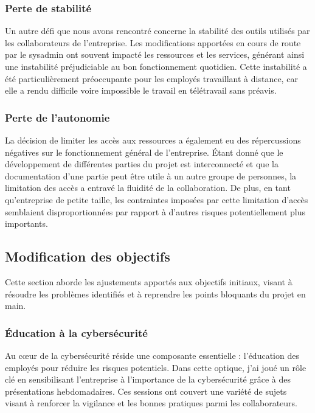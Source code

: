 \subsubsection{Perte de stabilité}
Un autre défi que nous avons rencontré concerne la stabilité des outils utilisés par les collaborateurs de l'entreprise.
Les modifications apportées en cours de route par le sysadmin ont souvent impacté les ressources et les services, générant ainsi une instabilité préjudiciable au bon fonctionnement quotidien.
Cette instabilité a été particulièrement préoccupante pour les employés travaillant à distance, car elle a rendu difficile voire impossible le travail en télétravail sans préavis.

\subsubsection{Perte de l'autonomie}
La décision de limiter les accès aux ressources a également eu des répercussions négatives sur le fonctionnement général de l'entreprise.
Étant donné que le développement de différentes parties du projet est interconnecté et que la documentation d'une partie peut être utile à un autre groupe de personnes, la limitation des accès a entravé la fluidité de la collaboration.
De plus, en tant qu'entreprise de petite taille, les contraintes imposées par cette limitation d'accès semblaient disproportionnées par rapport à d'autres risques potentiellement plus importants.

\newpage

\subsection{Modification des objectifs}
Cette section aborde les ajustements apportés aux objectifs initiaux, visant à résoudre les problèmes identifiés et à reprendre les points bloquants du projet en main.

\subsubsection{Éducation à la cybersécurité}
Au cœur de la cybersécurité réside une composante essentielle : l'éducation des employés pour réduire les risques potentiels.
Dans cette optique, j'ai joué un rôle clé en sensibilisant l'entreprise à l'importance de la cybersécurité grâce à des présentations hebdomadaires.
Ces sessions ont couvert une variété de sujets visant à renforcer la vigilance et les bonnes pratiques parmi les collaborateurs.


